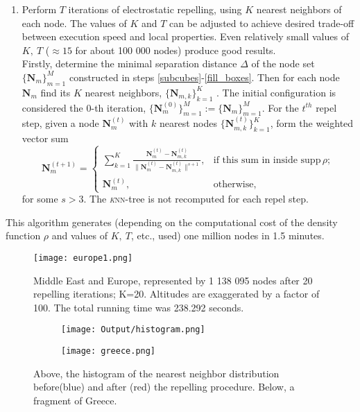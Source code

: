 \documentclass[10pt]{amsart}
\begin{document}
\begin{enumerate}
	\item Perform $ T $ iterations of electrostatic repelling, using $ K $ nearest neighbors of each node. The values of $ K $ and $ T $ can be adjusted to achieve desired trade-off between execution speed and local properties. Even relatively small values of $ K,\ T $ ($ \approx 15 $ for about 100 000 nodes) produce good results. \\
	Firstly, determine the minimal separation distance $ \Delta $ of the node set $ \{\boldsymbol{N}_m\}_{m=1}^M $ constructed in steps \eqref{subcubes}-\eqref{fill_boxes}. Then for each node $ \boldsymbol{N}_m $ find its $ K $ nearest neighbors, $ \{\boldsymbol{N}_{m,k}\}_{k=1}^K $ . The initial configuration is considered the $ 0 $-th iteration, $ \{\boldsymbol{N}_m^{(0)}\}_{m=1}^M := \{\boldsymbol{N}_m\}_{m=1}^M $. For the $t^{th}$ repel step, given a node $\boldsymbol{N}_m^{(t)}$ with $ k $ nearest nodes $\{ \boldsymbol{N}_{m,k}^{(t)}\}_{k=1}^K$, form the weighted vector sum
	\[\boldsymbol{N}_m^{(t+1)} = \begin{cases}
	\sum_{k=1}^{K}\frac{\boldsymbol{N}_m^{(t)}-\boldsymbol{N}_{m,k}^{(t)} }{\|\boldsymbol{N}_m^{(t)}-\boldsymbol{N}_{m,k}^{(t)} \|^{s+1}}, &\text{if this sum in inside }\text{supp}\,\rho; \\
	\boldsymbol{N}_m^{(t)}, &\text{otherwise,}
	\end{cases} \]
	for some $s>3$.
	The \textsc{\textit{k}nn}-tree is not recomputed for each repel step.
\end{enumerate}
This algorithm generates (depending on the computational cost of the density function $ \rho $ and values of $ K,\  T$, etc., used) one million nodes in 1.5 minutes.

\begin{figure}
	\centering
	\texttt{[image: europe1.png]}
	\caption{Middle East and Europe, represented by 1 138 095 nodes after 20 repelling iterations; K=20. Altitudes are exaggerated by a factor of 100. The total running time was 238.292 seconds.}
	\label{europe}
\end{figure}


\begin{figure}[h!]
	\centering
	\begin{subfigure}{\linewidth}
	\texttt{[image: Output/histogram.png]}
	\end{subfigure}
	\begin{subfigure}{\linewidth}
	\texttt{[image: greece.png]}
	\end{subfigure}
	\caption{Above, the histogram of the nearest neighbor distribution before(blue) and after (red) the repelling procedure. Below, a fragment of Greece.} 
	\label{fig:mult}
\end{figure}
\end{document}
